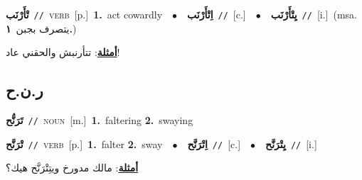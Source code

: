 \documentclass[10pt,a4paper,twoside]{article} %
\begin{document}
\begin{multicols}{2}
{\setlength\topsep{0pt}\textbf{\foreignlanguage{arabic}{تْأَرْنَب}}\ {\color{gray}\texttt{//}\color{black}}\ \textsc{verb}\ [p.]\ \textbf{1.}~act cowardly\ \ $\bullet$\ \ \setlength\topsep{0pt}\textbf{\foreignlanguage{arabic}{اِتْأَرْنَب}}\ {\color{gray}\texttt{//}\color{black}}\ [c.]\ \ $\bullet$\ \ \setlength\topsep{0pt}\textbf{\foreignlanguage{arabic}{يِتْأَرْنَب}}\ {\color{gray}\texttt{//}\color{black}}\ [i.]\ \color{gray}(msa. \foreignlanguage{arabic}{يتصرف بجبن}~\foreignlanguage{arabic}{\textbf{١.}})\color{black}\  \begin{flushright}\color{gray}\foreignlanguage{arabic}{\textbf{\underline{\foreignlanguage{arabic}{أمثلة}}}: تتأرنبش والحقني عاد!}\end{flushright}\color{black}} \vspace{2mm}

\vspace{-3mm}
\subsection*{\color{blue}\foreignlanguage{arabic}{ر.ن.ح}\color{blue}{}} 

{\setlength\topsep{0pt}\textbf{\foreignlanguage{arabic}{تَرَنُّح}}\ {\color{gray}\texttt{//}\color{black}}\ \textsc{noun}\ [m.]\ \textbf{1.}~faltering  \textbf{2.}~swaying\ } \vspace{2mm}

{\setlength\topsep{0pt}\textbf{\foreignlanguage{arabic}{تْرَنَّح}}\ {\color{gray}\texttt{//}\color{black}}\ \textsc{verb}\ [p.]\ \textbf{1.}~falter  \textbf{2.}~sway\ \ $\bullet$\ \ \setlength\topsep{0pt}\textbf{\foreignlanguage{arabic}{اِتْرَنَّح}}\ {\color{gray}\texttt{//}\color{black}}\ [c.]\ \ $\bullet$\ \ \setlength\topsep{0pt}\textbf{\foreignlanguage{arabic}{يِتْرَنَّح}}\ {\color{gray}\texttt{//}\color{black}}\ [i.]\  \begin{flushright}\color{gray}\foreignlanguage{arabic}{\textbf{\underline{\foreignlanguage{arabic}{أمثلة}}}: مالك مدورخ ويتِتْرَنَّح هيك؟}\end{flushright}\color{black}} \vspace{2mm}


\end{multicols}
\end{document}
